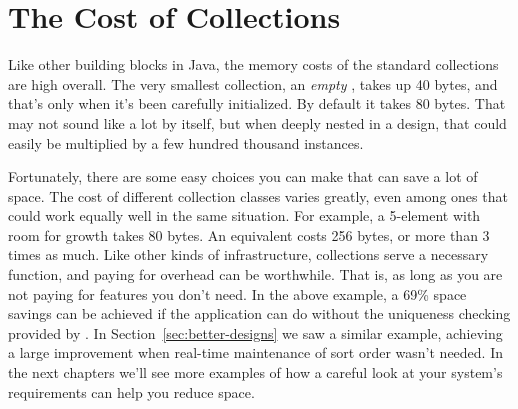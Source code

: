 
\section{The Cost of Collections}
\label{sec:designing-with-collections}

Like other building blocks in Java, the memory costs
of the standard collections are high overall. 
The very smallest collection, an \emph{empty}
, takes up 40 bytes, and that's only when it's been carefully
initialized. By default it takes 80 bytes. That may not sound like a lot by
itself, but when deeply nested in a design, that could easily be multiplied
by a few hundred thousand instances.  







Fortunately, there are some easy choices you can make that
can save a lot of space. The cost of different
collection classes varies greatly, even among ones that could work equally well
in the same situation. For example, a 5-element  with room for growth takes 80 bytes. 
An equivalent  costs 256 bytes,
or more than 3 times as much. Like other kinds of infrastructure, collections
serve a necessary function, and paying for overhead can be worthwhile. That is, as long as you are not
paying for features you don't need. In the above example, a
69\% space savings can be achieved if the application can do without the
uniqueness checking provided by .  In
Section~\ref{sec:better-designs} we saw a similar example, achieving a large
improvement when real-time
maintenance of sort order wasn't needed. In the next chapters we'll see more
examples of how a careful look at your system's
requirements can help you reduce space.


